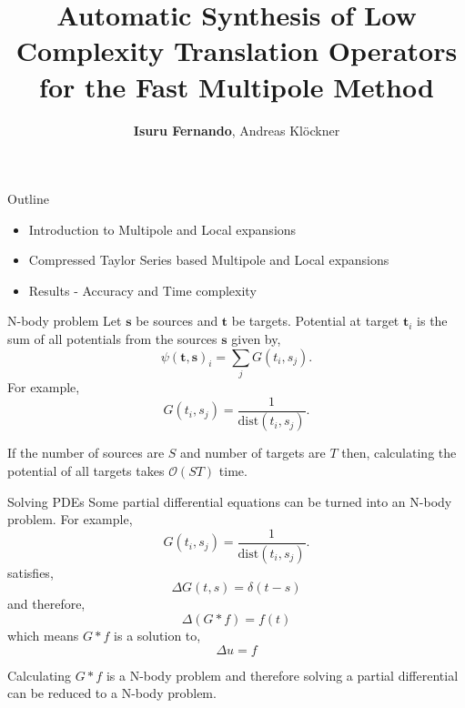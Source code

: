 \documentclass[10pt]{beamer}
\title{Automatic Synthesis of Low Complexity Translation Operators for the Fast Multipole Method}
\author{\textbf{Isuru Fernando}, Andreas Kl{\"o}ckner}
\def\b#1{\mathbf{ #1}}
\begin{document}
\maketitle

\begin{frame}[fragile]{Outline}
 \begin{itemize}
  \item Introduction to Multipole and Local expansions
  \item Compressed Taylor Series based Multipole and Local expansions
  \item Results - Accuracy and Time complexity
 \end{itemize}

\end{frame}

\begin{frame}[fragile]{N-body problem}
Let $\b s$ be sources and $\b t$ be targets. Potential at target $\b t_i$ is the sum of all potentials from the sources $\b s$ given by,
\[\psi(\b t, \b s)_i =  \sum_{j} G(t_i, s_j).\]
For example, \[G(t_i, s_j) = \frac{1}{\text{dist}(t_i, s_j)}.\]
\begin{center}
\end{center}
If the number of sources are $S$ and number of targets are $T$ then,
calculating the potential of all targets takes $\mathcal{O}(S T)$ time.

\end{frame}

\begin{frame}[fragile]{Solving PDEs}
 Some partial differential equations can be turned into an N-body problem.
 For example, \[G(t_i, s_j) = \frac{1}{\text{dist}(t_i, s_j)}.\]
 satisfies,
 \[
  \Delta G(t, s) = \delta(t - s)
 \]
 and therefore,
 \[
  \Delta (G * f) = f(t)
 \]
 which means $G * f$ is a solution to,
 \[
  \Delta u = f
 \]

 Calculating $G * f$ is a N-body problem and therefore solving a partial differential can be reduced to a N-body problem.


\end{frame}
\end{document}
